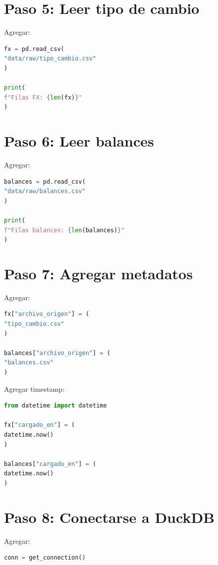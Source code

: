 \section{Paso 5: Leer tipo de cambio}

Agregar:

\begin{lstlisting}[language=Python]
fx = pd.read_csv(
"data/raw/tipo_cambio.csv"
)

print(
f"Filas FX: {len(fx)}"
)
\end{lstlisting}

\section{Paso 6: Leer balances}

Agregar:

\begin{lstlisting}[language=Python]
balances = pd.read_csv(
"data/raw/balances.csv"
)

print(
f"Filas balances: {len(balances)}"
)
\end{lstlisting}

\section{Paso 7: Agregar metadatos}

Agregar:

\begin{lstlisting}[language=Python]
fx["archivo_origen"] = (
"tipo_cambio.csv"
)

balances["archivo_origen"] = (
"balances.csv"
)
\end{lstlisting}

Agregar timestamp:

\begin{lstlisting}[language=Python]
from datetime import datetime

fx["cargado_en"] = (
datetime.now()
)

balances["cargado_en"] = (
datetime.now()
)
\end{lstlisting}

\section{Paso 8: Conectarse a DuckDB}

Agregar:

\begin{lstlisting}[language=Python]
conn = get_connection()
\end{lstlisting}

